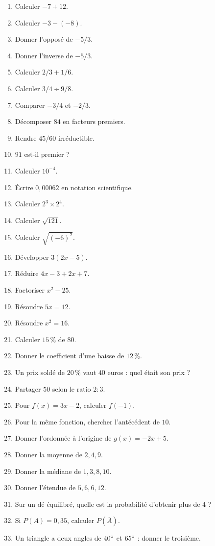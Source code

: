 \documentclass[11pt,a4paper,oneside]{book}
\begin{document}
\begin{enumerate}
\item Calculer $-7+12$.
\item Calculer $-3-(-8)$.
\item Donner l'opposé de $-5/3$.
\item Donner l'inverse de $-5/3$.
\item Calculer $2/3+1/6$.
\item Calculer $3/4\div9/8$.
\item Comparer $-3/4$ et $-2/3$.
\item Décomposer $84$ en facteurs premiers.
\item Rendre $45/60$ irréductible.
\item $91$ est-il premier ?
\item Calculer $10^{-4}$.
\item Écrire $0{,}00062$ en notation scientifique.
\item Calculer $2^3\times2^4$.
\item Calculer $\sqrt{121}$.
\item Calculer $\sqrt{(-6)^2}$.
\item Développer $3(2x-5)$.
\item Réduire $4x-3+2x+7$.
\item Factoriser $x^2-25$.
\item Résoudre $5x=12$.
\item Résoudre $x^2=16$.
\item Calculer $15\,\%$ de $80$.
\item Donner le coefficient d'une baisse de $12\,\%$.
\item Un prix soldé de $20\,\%$ vaut $40$ euros : quel était son prix ?
\item Partager $50$ selon le ratio $2:3$.
\item Pour $f(x)=3x-2$, calculer $f(-1)$.
\item Pour la même fonction, chercher l'antécédent de $10$.
\item Donner l'ordonnée à l'origine de $g(x)=-2x+5$.
\item Donner la moyenne de $2,4,9$.
\item Donner la médiane de $1,3,8,10$.
\item Donner l'étendue de $5,6,6,12$.
\item Sur un dé équilibré, quelle est la probabilité d'obtenir plus de $4$ ?
\item Si $P(A)=0{,}35$, calculer $P(\overline A)$.
\item Un triangle a deux angles de $40^{\circ}$ et $65^{\circ}$ : donner le troisième.

\end{enumerate}
\end{document}

